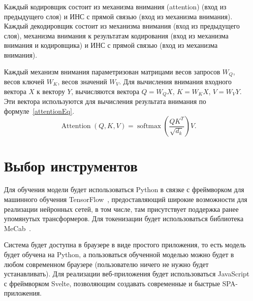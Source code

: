 Каждый кодировщик состоит из механизма внимания (attention) (вход из предыдущего слоя) и ИНС с прямой связью (вход из механизма внимания). Каждый декодировщик состоит из механизма внимания (вход из предыдущего слоя), механизма внимания к результатам кодирования (вход из механизма внимания и кодировщика) и ИНС с прямой связью (вход из механизма внимания).

Каждый механизм внимания параметризован матрицами весов запросов $W_{Q}$, весов ключей $W_{K}$, весов значений $W_{V}$. Для вычисления внимания входного вектора $X$ к вектору $Y$, вычисляются вектора $Q=W_{Q}X$, $K=W_{K}X$, $V=W_{V}Y$. Эти вектора используются для вычисления результата внимания по формуле~\eqref{attentionEq}. 
\begin{equation}\label{attentionEq}%
  \operatorname{Attention}(Q, K, V) = \operatorname{softmax}\left(\frac{QK^T}{\sqrt{d_k}}\right) V.
\end{equation}
% 
% 
% 


\section{Выбор инструментов}


Для обучения модели будет использоваться Python в связке с фреймворком для машинного обучения TensorFlow~\cite{Tensorflow}, предоставляющий широкие возможности для реализации нейронных сетей, в том числе, там присутствует поддержка ранее упомянутых трансформеров.
Для токенизации будет использоваться библиотека MeCab~\cite{MeCab}.

Система будет доступна в браузере в виде простого приложения, то есть модель будет обучена на Python, а пользоваться обученной моделью можно будет в любом современном браузере (пользователю ничего не нужно будет устанавливать).
Для реализации веб-приложения будет использоваться JavaScript с фреймворком Svelte, позволяющим создавать современные и быстрые SPA-приложения.
